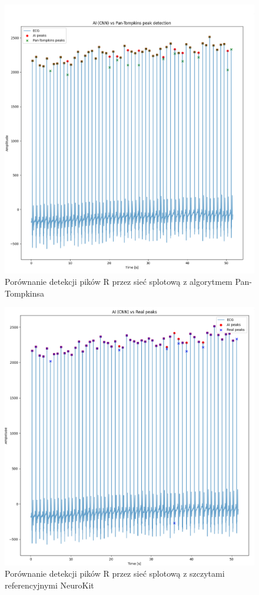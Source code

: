 \documentclass[journal]{IEEEtran}
\begin{document}
\begin{figure}[htbp]
    \centering
    \includegraphics[scale=0.2]{ai_pan-tompkins.png}
    \caption{Porównanie detekcji pików R przez sieć splotową z algorytmem Pan-Tompkinsa}
    \label{fig:ai_pan-tompkins}
\end{figure}

\begin{figure}[htbp]
    \centering
    \includegraphics[scale=0.2]{ai_real_peaks.png}
    \caption{Porównanie detekcji pików R przez sieć splotową z szczytami referencyjnymi NeuroKit}
    \label{fig:ai_real_peaks}
\end{figure}
\end{document}
